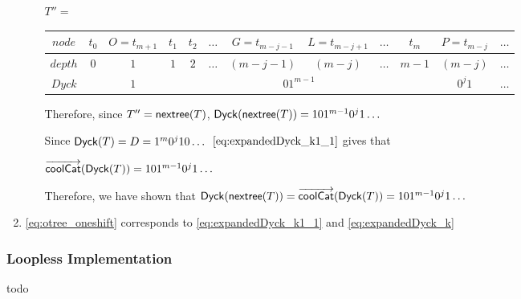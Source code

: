 \begin{enumerate}
\begin{itemize}
\bigskip
\bigskip


		$T''=$
		\begin{center}
		\begin{tabular}{ |c|c|c|c|c|c|c|c|c|c|c|c| } 
		 \hline

		    $node$ & $t_0$ & $O=t_{m+1}$ & $t_1$ & $t_2$ & $\dots$ & $G=t_{m-j-1}$ & $L=t_{m-j+1}$ & $\dots$ & $t_m$ & $P=t_{m-j}$ & $\dots$ \\
		 \hline
		    $depth$ & $0$ & $1$ & $1$ & $2$ &$\dots$ & $(m-j-1)$ & $(m-j)$ & $\dots$ & $m-1$ & $(m-j)$   & $\dots$\\
		 \hline
		    $Dyck$ &  & $1$ &  \multicolumn{7}{|c|}{$01^{m-1}$} &  $0^{j}1$   & $\dots$\\
		 \hline
		\end{tabular}
		\end{center}


		\bigskip
		\bigskip




		Therefore, since $T''=\mathsf{nextree}{(T)}$, $\mathsf{Dyck}{(\mathsf{nextree}{(T)})}=101^{m-1}0^j1\dots$

		Since $\mathsf{Dyck}{(T)}=D=1^m0^{j}10\dots$
		$\ref{eq:expandedDyck_k1_1}$ gives that

		$\overrightarrow{\mathsf{coolCat}}{(\mathsf{Dyck}{(T)})}=101^{m-1}0^j1\dots$

		Therefore, we have shown that $\mathsf{Dyck}{(\mathsf{nextree}{(T)})}=\overrightarrow{\mathsf{coolCat}}{(\mathsf{Dyck}{(T)})}=101^{m-1}0^j1\dots$
	\end{itemize}

    \item \ref{eq:otree_oneshift} corresponds to \ref{eq:expandedDyck_k1_1} and \ref{eq:expandedDyck_k}
\end{enumerate}



\subsubsection{Loopless Implementation}
todo
